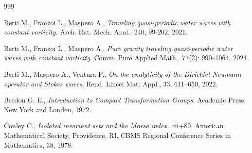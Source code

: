 \documentclass[11pt,a4paper,reqno]{article}
\numberwithin{equation}{section}
\theoremstyle{definition}
\begin{document}
\begin{footnotesize}
\begin{thebibliography}{999}

	Berti M., Franzoi L.,  Maspero A., \emph{Traveling quasi-periodic water waves with constant vorticity.} Arch. Rat. Mech. Anal., 240, 99-202, 2021. 

Berti M., Franzoi L., Maspero A.,
 {\it  Pure gravity traveling quasi-periodic water waves with constant vorticity}.
 Comm. Pure Applied Math., 77(2): 990--1064, 2024.
	
  Berti M.,   Maspero A.,  Ventura P., 
\emph{On the analyticity of the Dirichlet-Neumann operator and Stokes waves}. 
Rend. Lincei Mat. Appl., %
33, 611--650, 2022.


  Bredon G. E., {\it Introduction to Compact Transformation Groups}. Academic Press, New York and London, 1972.






Conley C., 
{\it  Isolated invariant sets and the {M}orse index.}, iii+89,
	American Mathematical Society, Providence, RI, CBMS Regional Conference Series in Mathematics,
	38, 1978.
    




\end{thebibliography}
\end{footnotesize}
\end{document}
